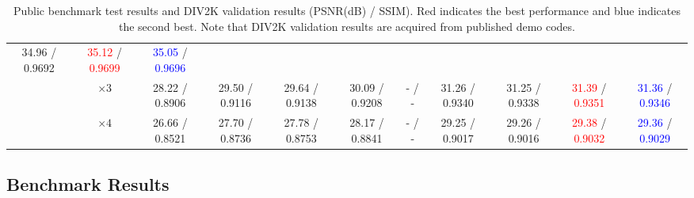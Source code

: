 \documentclass[10pt,twocolumn,letterpaper]{article}
\begin{document}
\begin{table*}[th]
{\begin{center}
\begin{adjustbox}{width=1.1\textwidth, center=\textwidth+0.5cm}
\begin{tabular} {|*{11}{c|}}
						34.96 / 0.9692 &
						\textcolor{red}{35.12} / \textcolor{red}{0.9699} &
						\textcolor{blue}{35.05} / \textcolor{blue}{0.9696} \\
						& $\times 3$ &
						28.22 / 0.8906 & 29.50 / 0.9116 & 29.64 / 0.9138 & 30.09 / 0.9208 & - / - &
						31.26 / 0.9340 &	
						31.25 / 0.9338 &
						\textcolor{red}{31.39} / \textcolor{red}{0.9351} &
						\textcolor{blue}{31.36} / \textcolor{blue}{0.9346} \\
						& $\times 4$ &
						26.66 / 0.8521 & 27.70 / 0.8736 & 27.78 / 0.8753 & 28.17 / 0.8841 & - / - &
						29.25 / 0.9017 &
						29.26 / 0.9016 &
						\textcolor{red}{29.38} / \textcolor{red}{0.9032} &
						\textcolor{blue}{29.36} / \textcolor{blue}{0.9029} \\
						\hline								
					\end{tabular}
				\end{adjustbox}
			\end{center}
		}
		\captionsetup{justification=raggedright,singlelinecheck=false}
		\caption{Public benchmark test results and DIV2K validation results (PSNR(dB) / SSIM). 
			Red indicates the best performance and blue indicates the second best.
			Note that DIV2K validation results are acquired from published demo codes.}
		\label{table_bench}
	\end{table*}
	
\iffalse
	\hline\hline
	\multirow{3}{*}{\parbox[c]{1cm}{\centering DIV2K\\validation}}
	& $\times 2$ &
	31.01 / 0.9393 & 32.89 / 0.9570 & 33.05 / 0.9581 & 33.66 / 0.9625 & - / - &
	35.03 / 0.9695 &	
	34.96 / 0.9692 &
	\textcolor{red}{35.12} / \textcolor{red}{0.9699} &
	\textcolor{blue}{35.05} / \textcolor{blue}{0.9696} \\
	& $\times 3$ &
	28.22 / 0.8906 & 29.50 / 0.9116 & 29.64 / 0.9138 & 30.09 / 0.9208 & - / - &
	31.26 / 0.9340 &	
	31.25 / 0.9338 &
	\textcolor{red}{31.39} / \textcolor{red}{0.9351} &
	\textcolor{blue}{31.36} / \textcolor{blue}{0.9346} \\
	& $\times 4$ &
	26.66 / 0.8521 & 27.70 / 0.8736 & 27.78 / 0.8753 & 28.17 / 0.8841 & - / - &
	29.25 / 0.9017 &
	29.26 / 0.9016 &
	\textcolor{red}{29.38} / \textcolor{red}{0.9032} &
	\textcolor{blue}{29.36} / \textcolor{blue}{0.9029} \\      					
	\fi
	
	\subsection{Benchmark Results}
	
\end{document}
